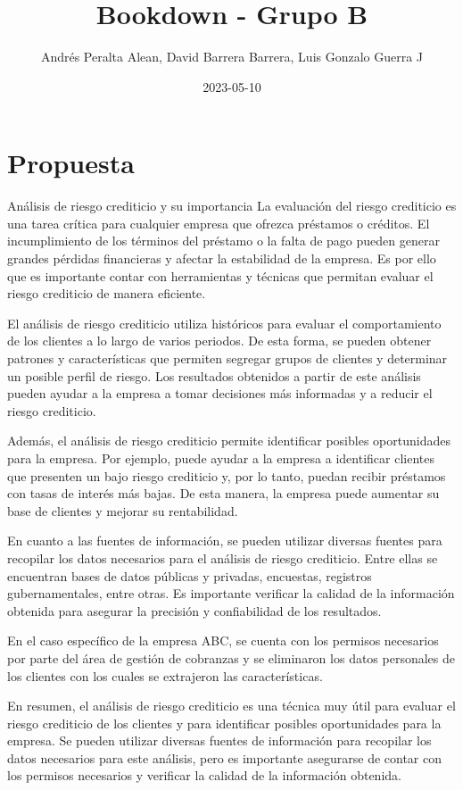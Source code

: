 \documentclass[
]{book}
\title{Bookdown - Grupo B}
\author{Andrés Peralta Alean, David Barrera Barrera, Luis Gonzalo Guerra J}
\date{2023-05-10}
\begin{document}
\maketitle

{
\setcounter{tocdepth}{1}
\tableofcontents
}
\hypertarget{propuesta}{%
\chapter{Propuesta}\label{propuesta}}

Análisis de riesgo crediticio y su importancia La evaluación del riesgo crediticio es una tarea crítica para cualquier empresa que ofrezca préstamos o créditos.
El incumplimiento de los términos del préstamo o la falta de pago pueden generar grandes pérdidas financieras y afectar la estabilidad de la empresa.
Es por ello que es importante contar con herramientas y técnicas que permitan evaluar el riesgo crediticio de manera eficiente.

El análisis de riesgo crediticio utiliza históricos para evaluar el comportamiento de los clientes a lo largo de varios periodos.
De esta forma, se pueden obtener patrones y características que permiten segregar grupos de clientes y determinar un posible perfil de riesgo.
Los resultados obtenidos a partir de este análisis pueden ayudar a la empresa a tomar decisiones más informadas y a reducir el riesgo crediticio.

Además, el análisis de riesgo crediticio permite identificar posibles oportunidades para la empresa.
Por ejemplo, puede ayudar a la empresa a identificar clientes que presenten un bajo riesgo crediticio y, por lo tanto, puedan recibir préstamos con tasas de interés más bajas.
De esta manera, la empresa puede aumentar su base de clientes y mejorar su rentabilidad.

En cuanto a las fuentes de información, se pueden utilizar diversas fuentes para recopilar los datos necesarios para el análisis de riesgo crediticio.
Entre ellas se encuentran bases de datos públicas y privadas, encuestas, registros gubernamentales, entre otras.
Es importante verificar la calidad de la información obtenida para asegurar la precisión y confiabilidad de los resultados.

En el caso específico de la empresa ABC, se cuenta con los permisos necesarios por parte del área de gestión de cobranzas y se eliminaron los datos personales de los clientes con los cuales se extrajeron las características.

En resumen, el análisis de riesgo crediticio es una técnica muy útil para evaluar el riesgo crediticio de los clientes y para identificar posibles oportunidades para la empresa.
Se pueden utilizar diversas fuentes de información para recopilar los datos necesarios para este análisis, pero es importante asegurarse de contar con los permisos necesarios y verificar la calidad de la información obtenida.
\end{document}
